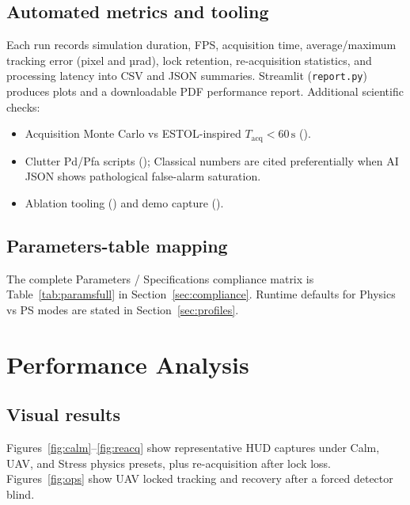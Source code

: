 \documentclass[11pt,a4paper]{article}
\begin{document}
\subsection{Automated metrics and tooling}
Each run records simulation duration, FPS, acquisition time, average/maximum tracking error (pixel and µrad), lock retention, re-acquisition statistics, and processing latency into CSV and JSON summaries.
Streamlit (\texttt{report.py}) produces plots and a downloadable PDF performance report.
Additional scientific checks:
\begin{itemize}
  \item Acquisition Monte Carlo vs ESTOL-inspired $T_{\mathrm{acq}}<60\,\mathrm{s}$ ().
  \item Clutter Pd/Pfa scripts (); Classical numbers are cited preferentially when AI JSON shows pathological false-alarm saturation.
  \item Ablation tooling () and demo capture ().
\end{itemize}

\subsection{Parameters-table mapping}
The complete Parameters / Specifications compliance matrix is Table~\ref{tab:paramsfull} in Section~\ref{sec:compliance}.
Runtime defaults for Physics vs PS modes are stated in Section~\ref{sec:profiles}.

\section{Performance Analysis}

\subsection{Visual results}
Figures~\ref{fig:calm}--\ref{fig:reacq} show representative HUD captures under Calm, UAV, and Stress physics presets, plus re-acquisition after lock loss.
Figures~\ref{fig:ops} show UAV locked tracking and recovery after a forced detector blind.
\end{document}
